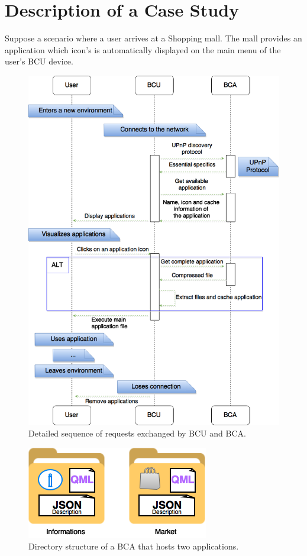 \documentclass[journal]{IEEEtran}
\begin{document}
\section{Description of a Case Study}
Suppose a scenario where a user arrives at a Shopping mall. The mall provides an application which icon's is automatically displayed on the main menu of the user's BCU device.

\begin{figure}[!htb]
    \includegraphics[scale = 0.24]{FIG4}
    \caption{Detailed sequence of requests exchanged by BCU and BCA.}
\end{figure}

\begin{figure}[!htb]
    \includegraphics[scale = 0.83]{FIG3}
    \caption{Directory structure of a BCA that hosts two applications.}
\end{figure}
\end{document}
